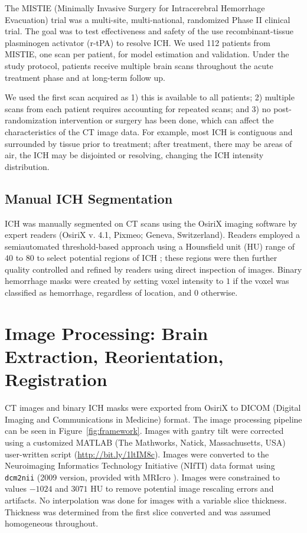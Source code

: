 \documentclass[12pt]{report}
\begin{document}
\begin{refsection}
The MISTIE (Minimally Invasive Surgery for Intracerebral Hemorrhage Evacuation) trial was a multi-site, multi-national, randomized Phase II clinical trial.  The goal was to test effectiveness and safety of the use recombinant-tissue plasminogen activator (r-tPA) to resolve ICH.  We used 112 patients from MISTIE, one scan per patient, for model estimation and validation.  Under the study protocol, patients receive multiple brain scans throughout the acute treatment phase and at long-term follow up.  

We used the first scan acquired as 1) this is available to all patients; 2) multiple scans from each patient requires accounting for repeated scans; and 3) no post-randomization intervention or surgery has been done, which can affect the characteristics of the CT image data.  For example, most ICH is contiguous and surrounded by tissue prior to treatment; after treatment, there may be areas of air, the ICH may be disjointed or resolving, changing the ICH intensity distribution.

\subsection{Manual ICH Segmentation}
ICH was manually segmented on CT scans using the OsiriX imaging software by expert readers (OsiriX v. 4.1, Pixmeo; Geneva, Switzerland).  Readers employed a semiautomated threshold-based approach using a Hounsfield unit (HU) range of $40$ to $80$ to select potential regions of ICH \citep{bergstrom_variation_1977, smith_imaging_2006}; these regions were then further quality controlled and refined by readers using direct inspection of images.  Binary hemorrhage masks were created by setting voxel intensity to $1$ if the voxel was classified as hemorrhage, regardless of location, and $0$ otherwise.  


\section{Image Processing: Brain Extraction, Reorientation, Registration}
CT images and binary ICH masks were exported from OsiriX to DICOM (Digital Imaging and Communications in Medicine) format.   The image processing pipeline can be seen in Figure~\ref{fig:framework}.   Images with gantry tilt were corrected using a customized MATLAB (The Mathworks, Natick, Massachusetts, USA) user-written script ({\scriptsize \url{http://bit.ly/1ltIM8c}}). Images were converted to the Neuroimaging Informatics Technology Initiative (NIfTI) data format using \verb|dcm2nii| (2009 version, provided with MRIcro \citep{rorden_stereotaxic_2000}).  Images were constrained to values $-1024$ and $3071$ HU to remove potential image rescaling errors and artifacts.  No interpolation was done for images with a variable slice thickness. Thickness was determined from the first slice converted and was assumed homogeneous throughout.  


\end{refsection}
\end{document}
